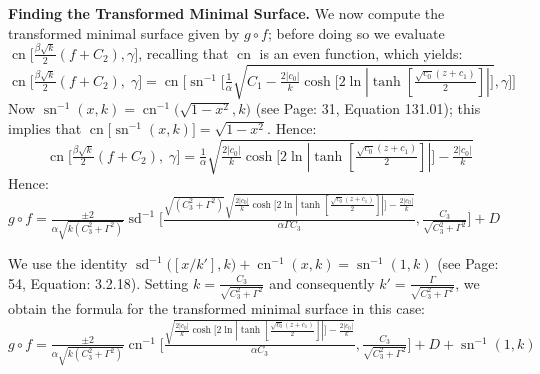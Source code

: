 \documentclass[12pt]{article}
\theoremstyle{plain}
\theoremstyle{definition}
\theoremstyle{remark}
\begin{document}
 \textbf{Finding the Transformed Minimal Surface.} We now compute the transformed minimal surface given by \(g\circ f\); before doing so we evaluate \(\operatorname{cn}\big[\tfrac{\beta\sqrt k}{2}(f+C_2),\gamma\big]\), recalling that \(\operatorname{cn}\) is an even function, which yields:
 \footnotesize\[
   \operatorname{cn}\big[\tfrac{\beta\sqrt k}{2}(f+C_2),\;\gamma\big]=\operatorname{cn}\Big[\operatorname{sn}^{-1}\big[\tfrac{1}{\alpha}\sqrt{C_1-\tfrac{2|c_0|}{k}\cosh\big[2\ln|\tanh[\tfrac{\sqrt{c_0}(z + c_1)}{2}]|\big]},\gamma\big]\Big]
 \]\normalsize
 Now \(\operatorname{sn}^{-1}(x,k)=\operatorname{cn}^{-1}\big(\sqrt{1-x^2},k\big)\) (see \cite{BF} Page: 31, Equation 131.01); this implies that \(\operatorname{cn}\!\big[\operatorname{sn}^{-1}(x,k)\big]=\sqrt{1-x^2}\). Hence:
 \footnotesize\[
   \operatorname{cn}\big[\tfrac{\beta\sqrt k}{2}(f+C_2),\;\gamma\big]=\tfrac{1}{\alpha}\sqrt{\tfrac{2|c_0|}{k}\cosh\big[2\ln|\tanh[\tfrac{\sqrt{c_0}(z + c_1)}{2}]|\big]-\tfrac{2|c_0|}{k}}
 \]\normalsize
 Hence: \footnotesize\(g\circ f=\tfrac{\pm2}{\alpha\sqrt{k(C_3^2+\Gamma^2)}}\operatorname{sd}^{-1}\Big[\tfrac{\sqrt{(C_3^2+\Gamma^2)}\sqrt{\frac{2|c_0|}{k}\cosh\big[2\ln|\tanh[\frac{\sqrt{c_0}(z + c_1)}{2}]|\big]-\frac{2|c_0|}{k}}}{\alpha\Gamma C_3},\tfrac{C_3}{\sqrt{C_3^2+\Gamma^2}}\Big]+D\)\normalsize

 We use the identity \(\operatorname{sd}^{-1}\!\big([x/k'],k\big)+\operatorname{cn}^{-1}(x,k)=\operatorname{sn}^{-1}(1,k)\) (see \cite{La} Page: 54, Equation: 3.2.18). Setting \(k=\tfrac{C_3}{\sqrt{C_3^2+\Gamma^2}}\) and consequently \(k'=\tfrac{\Gamma}{\sqrt{C_3^2+\Gamma^2}}\), we obtain the formula for the transformed minimal surface in this case:
 \footnotesize\[
  \boxed{ g\circ f=\tfrac{\pm2}{\alpha\sqrt{k(C_3^2+\Gamma^2)}}\operatorname{cn}^{-1}\Big[\tfrac{\sqrt{\frac{2|c_0|}{k}\cosh\big[2\ln|\tanh[\frac{\sqrt{c_0}(z + c_1)}{2}]|\big]-\frac{2|c_0|}{k}}}{\alpha C_3},\tfrac{C_3}{\sqrt{C_3^2+\Gamma^2}}\Big]+D+\operatorname{sn}^{-1}(1,k)}
 \]\normalsize
\end{document}
